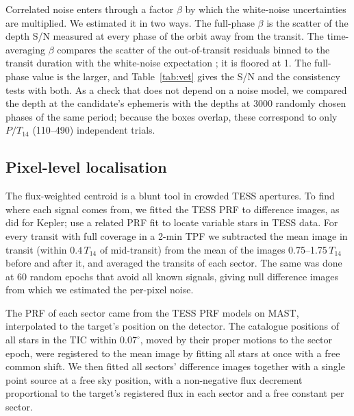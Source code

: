 \documentclass[twocolumn,numberedappendix,appendixfloats]{openjournal}
\begin{document}
Correlated noise enters through a factor $\beta$ by which the white-noise
uncertainties are multiplied. We estimated it in two ways. The full-phase
$\beta$ is the scatter of the depth S/N measured at every phase of the orbit
away from the transit. The time-averaging $\beta$ compares the scatter of the
out-of-transit residuals binned to the transit duration with the white-noise
expectation \citep{pont2006,winn2008}; it is floored at 1. The full-phase
value is the larger, and Table~\ref{tab:vet} gives the S/N and the consistency
tests with both. As a check that does not depend on a noise model, we compared
the depth at the candidate's ephemeris with the depths at 3000 randomly chosen
phases of the same period; because the boxes overlap, these correspond to only
$P/T_{14}$ (110--490) independent trials.

\subsection{Pixel-level localisation}
\label{sec:pixel}

The flux-weighted centroid is a blunt tool in crowded TESS apertures. To find
where each signal comes from, we fitted the TESS PRF to difference images, as
\citet{bryson2013} did for Kepler; \citet{higgins2023} use a related PRF fit to
locate variable stars in TESS data. For
every transit with full coverage in a 2-min TPF we subtracted the mean image in
transit (within $0.4\,T_{14}$ of mid-transit) from the mean of the images
0.75--1.75\,$T_{14}$ before and after it, and averaged the transits of each
sector. The same was done at 60 random epochs that avoid all known signals,
giving null difference images from which we estimated the per-pixel noise.

The PRF of each sector came from the TESS PRF models on MAST, interpolated to
the target's position on the detector. The catalogue positions of all stars in
the TIC within $0.07^\circ$, moved by their proper motions to the sector epoch,
were registered to the mean image by fitting all stars at once with a free
common shift. We then fitted all sectors' difference images together with a
single point source at a free sky position, with a non-negative flux decrement
proportional to the target's registered flux in each sector and a free
constant per sector.
\end{document}
